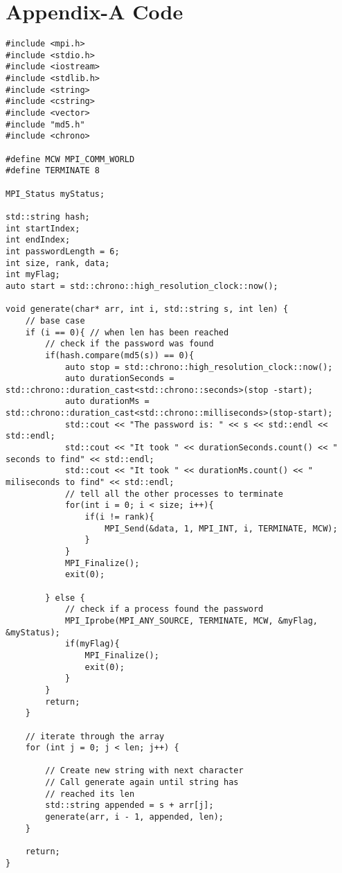 \documentclass[11pt]{article}
\begin{document}
\section{Appendix-A Code}
\begin{verbatim}
#include <mpi.h>
#include <stdio.h>
#include <iostream>
#include <stdlib.h>
#include <string>
#include <cstring>
#include <vector>
#include "md5.h"
#include <chrono>

#define MCW MPI_COMM_WORLD
#define TERMINATE 8

MPI_Status myStatus;

std::string hash;
int startIndex;
int endIndex;
int passwordLength = 6;
int size, rank, data;
int myFlag;
auto start = std::chrono::high_resolution_clock::now();

void generate(char* arr, int i, std::string s, int len) {
    // base case
    if (i == 0){ // when len has been reached
        // check if the password was found
        if(hash.compare(md5(s)) == 0){
            auto stop = std::chrono::high_resolution_clock::now();
            auto durationSeconds = std::chrono::duration_cast<std::chrono::seconds>(stop -start);
            auto durationMs = std::chrono::duration_cast<std::chrono::milliseconds>(stop-start);
            std::cout << "The password is: " << s << std::endl << std::endl;
            std::cout << "It took " << durationSeconds.count() << " seconds to find" << std::endl;
            std::cout << "It took " << durationMs.count() << " miliseconds to find" << std::endl;
            // tell all the other processes to terminate
            for(int i = 0; i < size; i++){
                if(i != rank){
                    MPI_Send(&data, 1, MPI_INT, i, TERMINATE, MCW);
                }
            }
            MPI_Finalize();
            exit(0);

        } else {
            // check if a process found the password
            MPI_Iprobe(MPI_ANY_SOURCE, TERMINATE, MCW, &myFlag, &myStatus);
            if(myFlag){
                MPI_Finalize();
                exit(0);
            }
        }
        return;
    }

    // iterate through the array
    for (int j = 0; j < len; j++) {

        // Create new string with next character
        // Call generate again until string has
        // reached its len
        std::string appended = s + arr[j];
        generate(arr, i - 1, appended, len);
    }

    return;
}


\end{verbatim}
\end{document}

